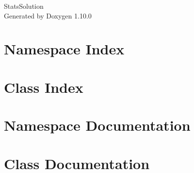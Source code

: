 \documentclass[twoside]{book}
\newcommand{\+}{\discretionary{\mbox{\scriptsize$\hookleftarrow$}}{}{}}
\newcommand{\clearemptydoublepage}{%
    \newpage{\pagestyle{empty}\cleardoublepage}%
  }
\begin{document}
  \raggedbottom
    \hypersetup{pageanchor=false,
                bookmarksnumbered=true,
                pdfencoding=unicode
               }
  \begin{titlepage}
  \vspace*{7cm}
  \begin{center}%
  {\Large Stats\+Solution}\\
  \vspace*{1cm}
  {\large Generated by Doxygen 1.10.0}\\
  \end{center}
  \end{titlepage}
  \clearemptydoublepage
  \tableofcontents
  \clearemptydoublepage
  \hypersetup{pageanchor=true}
\chapter{Namespace Index}

\chapter{Class Index}

\chapter{Namespace Documentation}


\chapter{Class Documentation}


  \backmatter
  \newpage
  \clearemptydoublepage
  \printindex
\end{document}
